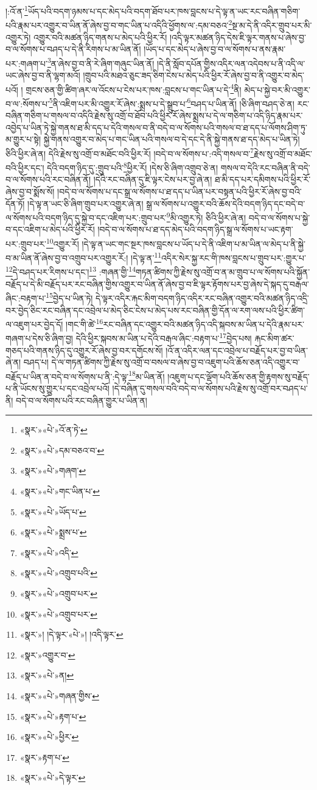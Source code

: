 །:འོ་ན་\footnote{«སྣར་»«པེ་»འོ་ན་ཏེ་}ཡོད་པའི་བདག་ཉམས་པ་དང་མེད་པའི་བདག་ཐོབ་པར་ཁས་བླངས་པ་དེ་ལྟ་ན་ཡང་རང་བཞིན་གཅིག་པའི་རྣམ་པར་འགྱུར་བ་ཡིན་ནོ་ཞེས་བྱ་བ་གང་ཡིན་པ་འདིའི་ཕྱོགས་ལ་:དམ་བཅའ་\footnote{«སྣར་»«པེ་»དམ་བཅའ་བ་}སྔ་མ་དེ་ནི་འདིར་གྲུབ་པར་མི་འགྱུར་ཏེ། འགྱུར་བའི་མཚན་ཉིད་གནས་པ་མེད་པའི་ཕྱིར་རོ། །འདི་ལྟར་མཚན་ཉིད་དེས་ཇི་ལྟར་གནས་པ་ཞེས་བྱ་བ་ལ་སོགས་པ་བཤད་པ་དེ་ནི་རིགས་པ་མ་ཡིན་ནོ། །ཡོད་པ་དང་མེད་པ་ཞེས་བྱ་བ་ལ་སོགས་པ་ནས་རྣམ་པར་:གཞག་པ་\footnote{«སྣར་»«པེ་»གཞག་}ན་ཞེས་བྱ་བ་ནི་རེ་ཞིག་གཞུང་ཡིན་ནོ། །དེ་ནི་སློབ་དཔོན་གྱིས་འདིར་ལན་འདེབས་པ་ནི་འདི་ལ་ཡང་ཞེས་བྱ་བ་ནི་ལྷག་མའོ། །གྲུབ་པའི་མཐའ་ཅུང་ཟད་ཅིག་ངེས་པ་མེད་པའི་ཕྱིར་རོ་ཞེས་བྱ་བ་ནི་འགྱུར་བ་མེད་པའོ། །
གྲངས་ཅན་གྱི་ཚིག་ཞར་ལ་འོངས་པ་ངེས་པར་ཁས་:བླངས་པ་གང་ཡིན་པ་དེ་\footnote{«སྣར་»«པེ་»གང་ཡིན་པ་}ནི། མེད་པ་སྐྱེ་བར་མི་འགྱུར་བ་ལ་:སོགས་པ་\footnote{«སྣར་»«པེ་»ཡོད་པ་}ནི་འཇིག་པར་མི་འགྱུར་རོ་ཞེས་:སྨྲས་པ་དེ་སྒྲུབ་པ་\footnote{«སྣར་»«པེ་»སྨྲས་པ་}བཤད་པ་ཡིན་ནོ། །ཅི་ཞིག་བཤད་ཅེ་ན། རང་བཞིན་གཅིག་པ་གསལ་བ་འདིའི་རྗེས་སུ་འགྲོ་བ་ཐོབ་པའི་ཕྱིར་རོ་ཞེས་སྨྲས་པ་དེ་ལ་གཅིག་པ་འདི་ཉིད་རྣམ་པར་འབྱེད་པ་ཡིན་ཏེ་སྐྱེ་གནས་ཐ་མི་དད་པ་དེའི་གསལ་བ་ནི་བདེ་བ་ལ་སོགས་པའི་གསལ་བ་ཐ་དད་པ་ལོགས་ཤིག་ཏུ་མ་གྱུར་པ་སྟེ། སྐྱེ་གནས་འགྱུར་བ་མེད་པ་གང་ཡིན་པའི་གསལ་བ་དེ་དང་དེ་ནི་སྐྱེ་གནས་ཐ་དད་མེད་པ་ཡིན་ཏེ། ཅིའི་ཕྱིར་ཞེ་ན། དེའི་རྗེས་སུ་འགྲོ་བ་མཐོང་བའི་ཕྱིར་རོ། །བདེ་བ་ལ་སོགས་པ་:འདི་གསལ་བ་\footnote{«སྣར་»«པེ་»འདི་}རྗེས་སུ་འགྲོ་བ་མཐོང་བའི་ཕྱིར་དང་། དེའི་བདག་ཉིད་དུ་:གྲུབ་པའི་\footnote{«སྣར་»«པེ་»འགྲུབ་པའི་}ཕྱིར་རོ། །དེས་ཅི་ཞིག་འགྲུབ་ཅེ་ན། གསལ་བ་དེའི་རང་བཞིན་ནི་བདེ་བ་ལ་སོགས་པའི་རང་བཞིན་ནོ། །དེའི་རང་བཞིན་དུ་ཇི་ལྟར་ངེས་པར་བྱ་ཞེ་ན། ཐ་མི་དད་པར་དམིགས་པའི་ཕྱིར་རོ་ཞེས་བྱ་བ་སྨོས་སོ། །བདེ་བ་ལ་སོགས་པ་དང་སྒྲ་ལ་སོགས་པ་ཐ་དད་པ་ཡིན་པར་བསྟན་པའི་ཕྱིར་རོ་ཞེས་བྱ་བའི་དོན་ཏོ། །དེ་ལྟ་ན་ཡང་ཅི་ཞིག་གྲུབ་པར་འགྱུར་ཞེ་ན། སྒྲ་ལ་སོགས་པ་འགྱུར་བའི་ཆོས་དེའི་བདག་ཉིད་དང་བདེ་བ་ལ་སོགས་པའི་བདག་ཉིད་དུ་སྐྱེ་བ་དང་འཇིག་པར་:གྲུབ་པར་\footnote{«སྣར་»«པེ་»འགྲུབ་པར་}མི་འགྱུར་ཏེ། ཅིའི་ཕྱིར་ཞེ་ན། བདེ་བ་ལ་སོགས་པ་སྐྱེ་བ་དང་འཇིག་པ་མེད་པའི་ཕྱིར་རོ། །བདེ་བ་ལ་སོགས་པ་ཐ་དད་མེད་པའི་བདག་ཉིད་སྒྲ་ལ་སོགས་པ་ཡང་རྟག་པར་:གྲུབ་པར་\footnote{«སྣར་»«པེ་»འགྲུབ་པར་}འགྱུར་རོ། །དེ་ལྟ་ན་ཡང་གང་སྔར་ཁས་བླངས་པ་ཡོད་པ་དེ་ནི་འཇིག་པ་མ་ཡིན་ལ་མེད་པ་ནི་སྐྱེ་བ་མ་ཡིན་ནོ་ཞེས་བྱ་བ་འགྲུབ་པར་འགྱུར་རོ:། །དེ་ལྟ་ན་\footnote{«སྣར་»། །དེ་ལྟར་«པེ་»། །འདི་ལྟར་}འདིར་སེར་སྐྱ་རང་གི་ཁས་བླངས་པ་གྲུབ་པར་:གྱུར་པ་\footnote{«སྣར་»འགྱུར་བ་}དེ་བཤད་པར་རིགས་པ་དང་།\footnote{«སྣར་»«པེ་»ན།} :གཞན་གྱི་\footnote{«སྣར་»«པེ་»གཞན་གྱིས་}གཏན་ཚིགས་ཀྱི་རྗེས་སུ་འགྲོ་བ་ན་མ་གྲུབ་པ་ལ་སོགས་པའི་སྐྱོན་བརྗོད་པ་དེ་མི་བརྗོད་པར་རང་བཞིན་གྱིས་འགྱུར་བ་ཡིན་ནོ་ཞེས་བྱ་བ་ཇི་ལྟར་རྟོགས་པར་བྱ་ཞེས་དེ་སྐད་དུ་བརྒལ་ཞིང་:བརྟག་པ་\footnote{«སྣར་»«པེ་»རྟག་པ་}བྱེད་པ་ཡིན་ཏེ། དེ་ལྟར་འདིར་རྐང་མིག་བདག་ཉིད་འདིར་རང་བཞིན་འགྱུར་བའི་མཚན་ཉིད་འདྲི་བར་བྱེད་ཅིང་རང་བཞིན་དང་འབྲེལ་པ་མེད་ཅིང་ངེས་པ་མེད་པས་རང་བཞིན་གྱི་དོན་ལ་རག་ལས་པའི་ཕྱིར་ཚིག་ལ་འཇུག་པར་བྱེད་དོ། །གང་གི་ཚེ་\footnote{«སྣར་»«པེ་»ཕྱིར་}རང་བཞིན་དང་འགྱུར་བའི་མཚན་ཉིད་འདི་སྐབས་མ་ཡིན་པ་དེའི་རྣམ་པར་གཞག་པ་དེས་ཅི་ཞིག་བྱ། དེའི་ཕྱིར་སྐབས་མ་ཡིན་པ་དེའི་བརྒལ་ཞིང་:བརྟག་པ་\footnote{«སྣར་»རྟག་པ་}བྱེད་པས། རྐང་མིག་ཚར་གཅད་པའི་གནས་ཉིད་དུ་འགྱུར་རོ་ཞེས་བྱ་བར་དགོངས་སོ། །འོ་ན་འདིར་ལན་དང་འབྲེལ་པ་བརྗོད་པར་བྱ་བ་ཡིན་ཞེ་ན། བཤད་པ། དེ་ལ་གཏན་ཚིགས་ཀྱི་རྗེས་སུ་འགྲོ་བ་བསལ་བ་ཞེས་བྱ་བ་འཇུག་པའི་ཆོས་ཅན་འདི་འགྱུར་བ་བརྗོད་པ་ཡིན་ན་བདེ་བ་ལ་སོགས་པ་ནི་:དེ་ལྟ་\footnote{«སྣར་»«པེ་»དེ་ལྟར་}མ་ཡིན་ནོ། །འཇུག་པ་དང་ལྡོག་པའི་ཆོས་ཅན་གྱི་རྟགས་སུ་བརྗོད་པ་ནི་ཡོངས་སུ་གྱུར་པ་དང་འབྲེལ་པའོ། །དེ་བཞིན་དུ་གསལ་བའི་བདེ་བ་ལ་སོགས་པའི་རྗེས་སུ་འགྲོ་བར་བཤད་པ་ནི། བདེ་བ་ལ་སོགས་པའི་རང་བཞིན་གྱུར་པ་ཡིན་ན། 